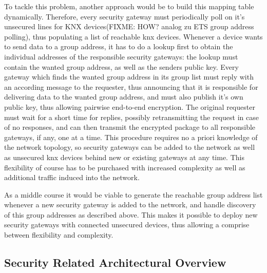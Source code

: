 To tackle this problem, another approach would be to build this mapping table dynamically. Therefore, every security gateway must periodically poll
on it's unsecured lines for KNX devices(FIXME: HOW? analog zu ETS group address polling), thus populating a list of reachable knx devices. Whenever a 
device wants to send data to a group address, it has to do a lookup first to obtain the individual addresses of the responsible security gateways: the lookup
must contain the wanted group address, as well as the senders public key.
Every 
gateway which finds the wanted group address in its group list must reply with an according message to the requester, thus announcing that it is responsible
for delivering data to the wanted group address, and must also publish it's own public key, thus allowing pairwise end-to-end encryption.
The original requester must wait for a short time for replies, possibly retransmitting the request in case
of no responses, and can then transmit the encrypted package to all responsible gateways, if any, one at a time. This procedure requires no a priori knowledge of
the network topology, so security gateways can be added to the network as well as unsecured knx devices behind new or existing gateways at any time. This
flexibility of course has to be purchased with increased complexity as well as additional traffic induced into the network.

As a middle course it would be viable to generate the reachable group address list whenever a new security gateway is added to the network,
and handle discovery of this group addresses as described
above. This makes it possible to deploy new security gateways with connected unsecured devices, thus allowing a comprise between flexibility and complexity.


\subsection{Security Related Architectural Overview}

